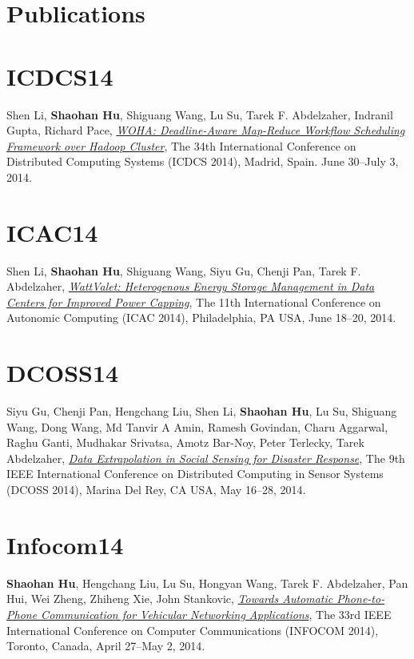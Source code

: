 \section{\sc Publications}

\section{\sc ICDCS14}\hypertarget{li2014icdcs}{}
Shen Li, \textbf{Shaohan Hu}, Shiguang Wang, Lu Su, Tarek F. Abdelzaher, Indranil Gupta, Richard Pace, \href{}{\emph{WOHA: Deadline-Aware Map-Reduce Workflow Scheduling Framework over Hadoop Cluster}}, \textsf{The 34th International Conference on Distributed Computing Systems (ICDCS 2014)}, Madrid, Spain. June 30--July 3, 2014.

\section{\sc ICAC14}\hypertarget{li2014icac}{}
Shen Li, \textbf{Shaohan Hu}, Shiguang Wang, Siyu Gu, Chenji Pan, Tarek F. Abdelzaher, \href{}{\emph{WattValet: Heterogenous Energy Storage Management in Data Centers for Improved Power Capping}}, \textsf{The 11th International Conference on Autonomic Computing (ICAC 2014)}, Philadelphia, PA USA, June 18--20, 2014.

\section{\sc DCOSS14}\hypertarget{gu2014dcoss}{}
Siyu Gu, Chenji Pan, Hengchang Liu, Shen Li, \textbf{Shaohan Hu}, Lu Su, Shiguang Wang, Dong Wang, Md Tanvir A Amin, Ramesh Govindan, Charu Aggarwal, Raghu Ganti, Mudhakar Srivatsa, Amotz Bar-Noy, Peter Terlecky, Tarek Abdelzaher, \href{}{\emph{Data Extrapolation in Social Sensing for Disaster Response}}, \textsf{The 9th IEEE International Conference on Distributed Computing in Sensor Systems (DCOSS 2014)}, Marina Del Rey, CA USA, May 16--28, 2014.

\section{\sc Infocom14}\hypertarget{hu2014infocom}{}
\textbf{Shaohan Hu}, Hengchang Liu, Lu Su, Hongyan Wang, Tarek F.
Abdelzaher, Pan Hui, Wei Zheng, Zhiheng Xie, John Stankovic,
\href{}{\emph{Towards Automatic Phone-to-Phone Communication for Vehicular
  Networking Applications}}, \textsf{The 33rd IEEE International Conference on Computer Communications (INFOCOM 2014)}, Toronto, Canada, April 27--May 2, 2014.

